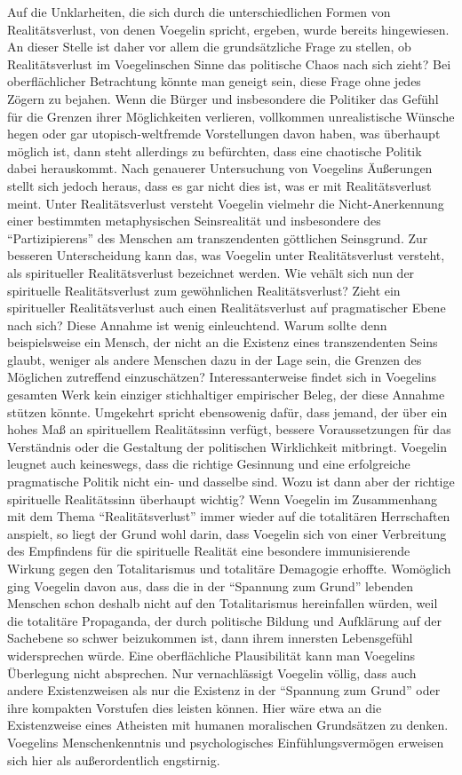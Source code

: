 Auf die Unklarheiten, die sich durch die unterschiedlichen Formen von
Realitätsverlust, von denen Voegelin spricht, ergeben, wurde bereits
hingewiesen. An dieser Stelle ist daher vor allem die grundsätzliche Frage zu
stellen, ob Realitätsverlust im Voegelinschen Sinne das politische Chaos nach
sich zieht?  Bei oberflächlicher Betrachtung könnte man geneigt sein, diese
Frage ohne jedes Zögern zu bejahen. Wenn die Bürger und insbesondere die
Politiker das Gefühl für die Grenzen ihrer Möglichkeiten verlieren, vollkommen
unrealistische Wünsche hegen oder gar utopisch-weltfremde Vorstellungen davon
haben, was überhaupt möglich ist, dann steht allerdings zu befürchten, dass
eine chaotische Politik dabei herauskommt.  Nach genauerer Untersuchung von
Voegelins Äußerungen stellt sich jedoch heraus, dass es gar nicht dies ist,
was er mit Realitätsverlust meint.  Unter Realitätsverlust versteht Voegelin
vielmehr die Nicht-Anerkennung einer bestimmten metaphysischen Seinsrealität
und insbesondere des "`Partizipierens"' des Menschen am transzendenten
göttlichen Seinsgrund.  Zur besseren Unterscheidung kann das, was Voegelin
unter Realitätsverlust versteht, als spiritueller Realitätsverlust bezeichnet
werden. Wie vehält sich nun der spirituelle Realitätsverlust zum gewöhnlichen
Realitätsverlust? Zieht ein spiritueller Realitätsverlust auch einen
Realitätsverlust auf pragmatischer Ebene nach sich? Diese Annahme ist wenig
einleuchtend. Warum sollte denn beispielsweise ein Mensch, der nicht an die
Existenz eines transzendenten Seins glaubt, weniger als andere Menschen dazu
in der Lage sein, die Grenzen des Möglichen zutreffend einzuschätzen?
Interessanterweise findet sich in Voegelins gesamten Werk kein einziger
stichhaltiger empirischer Beleg, der diese Annahme stützen könnte. Umgekehrt
spricht ebensowenig dafür, dass jemand, der über ein hohes Maß an spirituellem
Realitätssinn verfügt, bessere Voraussetzungen für das Verständnis oder die
Gestaltung der politischen Wirklichkeit mitbringt.  Voegelin leugnet auch
keineswegs, dass die richtige Gesinnung und eine erfolgreiche pragmatische
Politik nicht ein- und dasselbe sind. Wozu ist dann aber der richtige
spirituelle Realitätssinn überhaupt wichtig? Wenn Voegelin im Zusammenhang mit
dem Thema "`Realitätsverlust"' immer wieder auf die totalitären Herrschaften
anspielt, so liegt der Grund wohl darin, dass Voegelin sich von einer
Verbreitung des Empfindens für die spirituelle Realität eine besondere
immunisierende Wirkung gegen den Totalitarismus und totalitäre Demagogie
erhoffte. Womöglich ging Voegelin davon aus, dass die in der "`Spannung zum
Grund"' lebenden Menschen schon deshalb nicht auf den Totalitarismus
hereinfallen würden, weil die totalitäre Propaganda, der durch politische
Bildung und Aufklärung auf der Sachebene so schwer beizukommen ist, dann ihrem
innersten Lebensgefühl widersprechen würde.  Eine oberflächliche Plausibilität
kann man Voegelins Überlegung nicht absprechen. Nur vernachlässigt Voegelin
völlig, dass auch andere Existenzweisen als nur die Existenz in der "`Spannung
zum Grund"' oder ihre kompakten Vorstufen dies leisten können. Hier wäre etwa
an die Existenzweise eines Atheisten mit humanen moralischen Grundsätzen zu
denken. Voegelins Menschenkenntnis und psychologisches Einfühlungsvermögen
erweisen sich hier als außerordentlich engstirnig.
 
